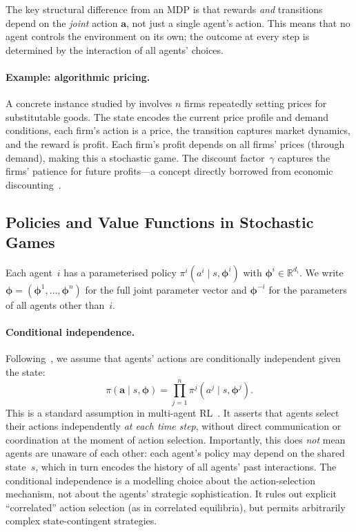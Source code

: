 The key structural difference from an MDP is that rewards \emph{and} transitions depend on the \emph{joint} action $\bm{a}$, not just a single agent's action. This means that no agent controls the environment on its own; the outcome at every step is determined by the interaction of all agents' choices.

\paragraph{Example: algorithmic pricing.} A concrete instance studied by \cite{calvano2020} involves $n$ firms repeatedly setting prices for substitutable goods. The state encodes the current price profile and demand conditions, each firm's action is a price, the transition captures market dynamics, and the reward is profit. Each firm's profit depends on all firms' prices (through demand), making this a stochastic game. The discount factor~$\gamma$ captures the firms' patience for future profits---a concept directly borrowed from economic discounting~\cite{vonneumann1944}.

\subsection{Policies and Value Functions in Stochastic Games}
\label{subsec:multi-agent-policies}

Each agent~$i$ has a parameterised policy $\pi^i(a^i\mid s,\bm{\phi}^i)$ with $\bm{\phi}^i\in\mathbb{R}^{d_i}$. We write $\bm{\phi}=(\bm{\phi}^1,\ldots,\bm{\phi}^n)$ for the full joint parameter vector and $\bm{\phi}^{-i}$ for the parameters of all agents other than~$i$.

\paragraph{Conditional independence.} Following~\cite{wen2019}, we assume that agents' actions are conditionally independent given the state:
\begin{equation}\label{eq:cond-indep}
  \pi(\bm{a}\mid s,\bm{\phi})=\prod_{j=1}^n\pi^j(a^j\mid s,\bm{\phi}^j).
\end{equation}
This is a standard assumption in multi-agent RL~\cite{lowe2017,kim2021policygradientalgorithmlearning}. It asserts that agents select their actions independently \emph{at each time step}, without direct communication or coordination at the moment of action selection. Importantly, this does \emph{not} mean agents are unaware of each other: each agent's policy may depend on the shared state~$s$, which in turn encodes the history of all agents' past interactions. The conditional independence is a modelling choice about the action-selection mechanism, not about the agents' strategic sophistication. It rules out explicit ``correlated'' action selection (as in correlated equilibria), but permits arbitrarily complex state-contingent strategies.


